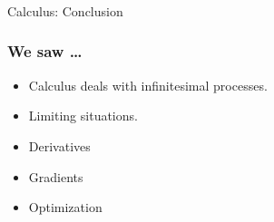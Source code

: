 \begin{frame}[fragile]\frametitle{}
\begin{center}
{\Large Calculus: Conclusion}
\end{center}
\end{frame}

 \begin{frame}[fragile]\frametitle{We saw \ldots}
\begin{itemize}
\item Calculus deals with infinitesimal processes.
\item Limiting situations.
\item Derivatives
\item Gradients
\item Optimization
\end{itemize}
\end{frame}





